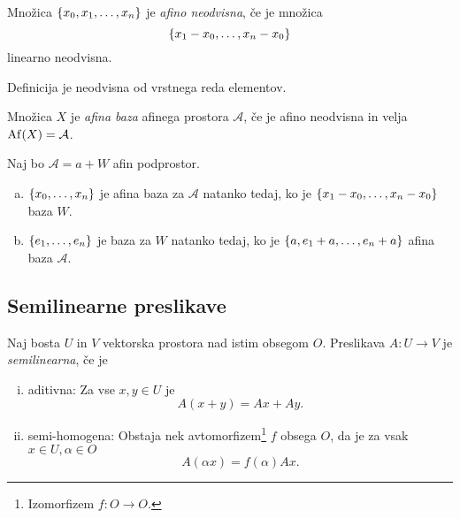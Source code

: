 \begin{definicija}
    Množica $\left\{x_0, x_1, \dots, x_n\right\}$ je \emph{afino neodvisna}, če je množica
    \[
    	\left\{x_1 - x_0, \dots, x_n - x_0\right\}
    \]
    linearno neodvisna.
\end{definicija}

\begin{opomba}
    Definicija je neodvisna od vrstnega reda elementov.
\end{opomba}

\begin{definicija}
    Množica $X$ je \emph{afina baza} afinega prostora $\mathcal{A}$, če je afino neodvisna in velja $\operatorname{Af} (X) = \mathcal{A}$.
\end{definicija}

\begin{izrek}
    Naj bo $\mathcal{A} = a + W$ afin podprostor.

	\begin{enumerate}[a)]
    \item $\left\{x_0, \dots, x_n\right\}$ je afina baza za $\mathcal{A}$ natanko tedaj, ko je $\left\{x_1 - x_0, \dots, x_n - x_0\right\}$ baza $W$.

    \item $\left\{e_1, \dots, e_n\right\}$ je baza za $W$ natanko tedaj, ko je $\left\{a, e_1 + a, \dots, e_n + a\right\}$ afina baza $\mathcal{A}$.	
	\end{enumerate}
\end{izrek}

\newpage

\subsection{Semilinearne preslikave}

\begin{definicija}
    Naj bosta $U$ in $V$ vektorska prostora nad istim obsegom $O$. Preslikava $A \colon U \to V$ je \emph{semilinearna}, če je
	
	\begin{enumerate}[(i)]
    \item aditivna: Za vse $x,y \in U$ je
    \[
    A(x + y) = Ax + Ay.    
    \]

    \item semi-homogena: Obstaja nek avtomorfizem\footnote{Izomorfizem $f \colon O \to O$.} $f$ obsega $O$, da je za vsak $x \in U, \alpha \in O$
    \[
    A(\alpha x) = f(\alpha) Ax.
    \]
	\end{enumerate}
\end{definicija}

